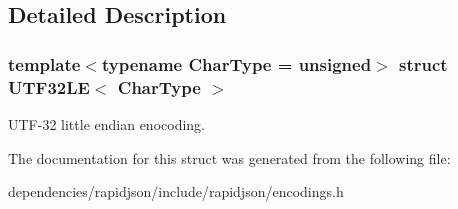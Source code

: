 \subsection{Detailed Description}
\subsubsection*{template$<$typename Char\+Type = unsigned$>$\newline
struct U\+T\+F32\+L\+E$<$ Char\+Type $>$}

U\+T\+F-\/32 little endian enocoding. 

The documentation for this struct was generated from the following file\+:\begin{DoxyCompactItemize}
\item 
dependencies/rapidjson/include/rapidjson/encodings.\+h\end{DoxyCompactItemize}
